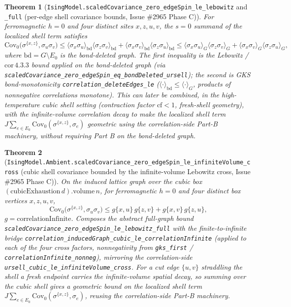 \documentclass[a4paper,11pt]{article}
\newtheorem{theorem}{Theorem}
\begin{document}
\begin{theorem}[\texttt{IsingModel.scaledCovariance\_zero\_edgeSpin\_le\_lebowitz}
and \texttt{\_full} (per-edge shell covariance bounds, Issue \#2965 Phase C)]
For ferromagnetic $h=0$ and four distinct sites $x,z,u,v$, the $s=0$ summand of the
localized shell term satisfies
\[
  \mathrm{Cov}_0\!\bigl(\sigma^{\{x,z\}},\sigma_u\sigma_v\bigr)
    \le \langle\sigma_x\sigma_u\rangle_{\mathrm{bd}}\langle\sigma_z\sigma_v\rangle_{\mathrm{bd}}
      + \langle\sigma_x\sigma_v\rangle_{\mathrm{bd}}\langle\sigma_z\sigma_u\rangle_{\mathrm{bd}}
    \le \langle\sigma_x\sigma_u\rangle_G\langle\sigma_z\sigma_v\rangle_G
      + \langle\sigma_x\sigma_v\rangle_G\langle\sigma_z\sigma_u\rangle_G,
\]
where $\mathrm{bd}=G\setminus E_0$ is the bond-deleted graph. The first inequality is
the Lebowitz / $\mathrm{cor}\,4.3.3$ bound applied on the bond-deleted graph (via
\texttt{scaledCovariance\_zero\_edgeSpin\_eq\_bondDeleted\_ursell}); the second is GKS
bond-monotonicity \texttt{correlation\_deleteEdges\_le} ($\langle\cdot\rangle_{\mathrm{bd}}
\le\langle\cdot\rangle_G$, products of nonnegative correlations monotone). This can later
be combined, in the high-temperature cubic shell setting (contraction factor
$\mathrm{cf}<1$, fresh-shell geometry), with the infinite-volume correlation decay to
make the localized shell term $J\sum_{e\in E_0}\mathrm{Cov}_0(\sigma^{\{x,z\}},\sigma_e)$
geometric using the correlation-side Part-B machinery, without requiring Part B on the
bond-deleted graph.
\end{theorem}

\begin{theorem}[\texttt{IsingModel.Ambient.scaledCovariance\_zero\_edgeSpin\_le\_infiniteVolume\_cross}
(cubic shell covariance bounded by the infinite-volume Lebowitz cross, Issue \#2965 Phase C)]
On the induced lattice graph over the cubic box $(\mathrm{cubicExhaustion}\,d).\mathrm{volume}\,n$,
for ferromagnetic $h=0$ and four distinct box vertices $x,z,u,v$,
\[
  \mathrm{Cov}_0\!\bigl(\sigma^{\{x,z\}},\sigma_u\sigma_v\bigr)
    \le g\{x,u\}\,g\{z,v\} + g\{x,v\}\,g\{z,u\},
\]
$g=\mathrm{correlationInfinite}$. Composes the abstract full-graph bound
\texttt{scaledCovariance\_zero\_edgeSpin\_le\_lebowitz\_full} with the
finite-to-infinite bridge \texttt{correlation\_inducedGraph\_cubic\_le\_correlationInfinite}
(applied to each of the four cross factors, nonnegativity from \texttt{gks\_first} /
\texttt{correlationInfinite\_nonneg}), mirroring the correlation-side
\texttt{ursell\_cubic\_le\_infiniteVolume\_cross}. For a cut edge $\{u,v\}$ straddling the
shell a fresh endpoint carries the infinite-volume spatial decay, so summing over the
cubic shell gives a geometric bound on the localized shell term
$J\sum_{e\in E_0}\mathrm{Cov}_0(\sigma^{\{x,z\}},\sigma_e)$, reusing the correlation-side
Part-B machinery.
\end{theorem}
\end{document}
